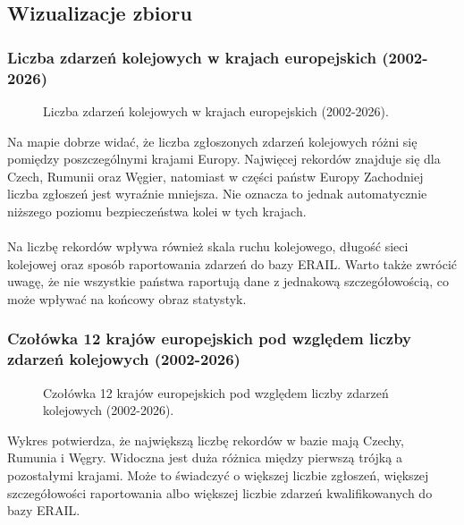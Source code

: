 \documentclass[12pt]{article}
\begin{document}
\newpage
\subsection{Wizualizacje zbioru}

\subsubsection{Liczba zdarzeń kolejowych w krajach europejskich (2002-2026)}
\begin{figure}[H]
    \centering
    
    \caption{Liczba zdarzeń kolejowych w krajach europejskich (2002-2026).}
\end{figure}

Na mapie dobrze widać, że liczba zgłoszonych zdarzeń kolejowych różni się pomiędzy poszczególnymi krajami Europy. Najwięcej rekordów znajduje się dla Czech, Rumunii oraz Węgier, natomiast w części państw Europy Zachodniej liczba zgłoszeń jest wyraźnie mniejsza. Nie oznacza to jednak automatycznie niższego poziomu bezpieczeństwa kolei w tych krajach. \\\\Na liczbę rekordów wpływa również skala ruchu kolejowego, długość sieci kolejowej oraz sposób raportowania zdarzeń do bazy ERAIL. Warto także zwrócić uwagę, że nie wszystkie państwa raportują dane z jednakową szczegółowością, co może wpływać na końcowy obraz statystyk.


\subsubsection{Czołówka 12 krajów europejskich pod względem liczby zdarzeń kolejowych (2002-2026)}
\begin{figure}[H]
    \centering
    
    \caption{Czołówka 12 krajów europejskich pod względem liczby zdarzeń kolejowych (2002-2026).}
\end{figure}

Wykres potwierdza, że największą liczbę rekordów w bazie mają Czechy, Rumunia i Węgry. Widoczna jest duża różnica między pierwszą trójką a pozostałymi krajami. Może to świadczyć o większej liczbie zgłoszeń, większej szczegółowości raportowania albo większej liczbie zdarzeń kwalifikowanych do bazy ERAIL.
\end{document}
